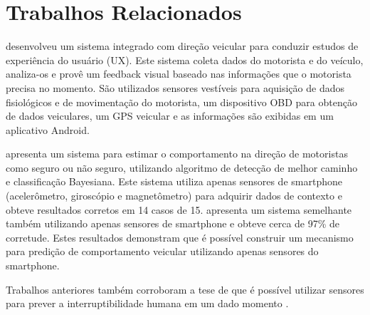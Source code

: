 \section{Trabalhos Relacionados}
\label{trabalhos-relacionados}

\cite{park2016integrated} desenvolveu um sistema integrado com direção veicular para conduzir estudos de experiência
do usuário (UX). Este sistema coleta dados do motorista e do veículo, analiza-os e provê um feedback visual baseado
nas informações que o motorista precisa no momento. São utilizados sensores vestíveis para aquisição de dados
fisiológicos e de movimentação do motorista, um dispositivo OBD para obtenção de dados veiculares, um GPS veicular e
as informações são exibidas em um aplicativo Android.

\cite{eren2012estimating} apresenta um sistema para estimar o comportamento na direção de motoristas como seguro ou
não seguro, utilizando algoritmo de detecção de melhor caminho e classificação Bayesiana. Este sistema utiliza
apenas sensores de smartphone (acelerômetro, giroscópio e magnetômetro) para adquirir dados de contexto e obteve
resultados corretos em 14 casos de 15. \cite{johnson2011driving} apresenta um sistema semelhante também utilizando
apenas sensores de smartphone e obteve cerca de 97\% de corretude. Estes resultados demonstram que é possível construir
um mecanismo para predição de comportamento veicular utilizando apenas sensores do smartphone.

Trabalhos anteriores também corroboram a tese de que é possível utilizar sensores para prever a interruptibilidade
humana em um dado momento \cite{fogarty2005predicting} \cite{hudson2003predicting}.

